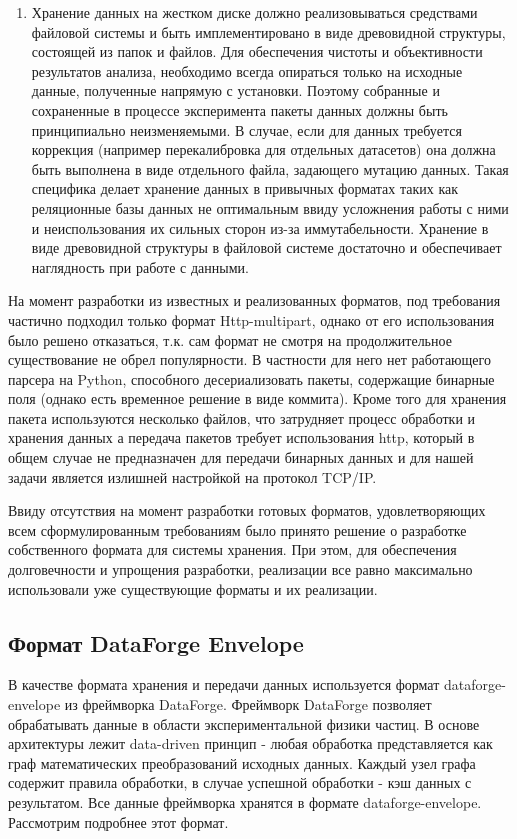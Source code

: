 \documentclass[a4paper,14pt]{extreport}
\begin{document}
\begin{enumerate}
    \item Хранение данных на жестком диске должно реализовываться средствами файловой системы и быть имплементировано в виде древовидной структуры, состоящей из папок и файлов. Для обеспечения чистоты и объективности результатов анализа, необходимо всегда опираться только на исходные данные, полученные напрямую с установки. Поэтому собранные и сохраненные в процессе эксперимента пакеты данных должны быть принципиально неизменяемыми. В случае, если для данных требуется коррекция (например перекалибровка для отдельных датасетов) она должна быть выполнена в виде отдельного файла, задающего мутацию данных. Такая специфика делает хранение данных в привычных форматах таких как реляционные базы данных не оптимальным ввиду усложнения работы с ними и неиспользования их сильных сторон из-за иммутабельности. Хранение в виде древовидной структуры в файловой системе достаточно и обеспечивает наглядность при работе с данными.
\end{enumerate}

На момент разработки из известных и реализованных форматов, под требования частично подходил только формат Http-multipart, однако от его использования было решено отказаться, т.к. сам формат не смотря на продолжительное существование не обрел популярности. В частности для него нет работающего парсера на Python, способного десериализовать пакеты, содержащие бинарные поля (однако есть временное решение в виде коммита\cite{multipart-fix}). Кроме того для хранения пакета используются несколько файлов, что затрудняет процесс обработки и хранения данных а передача пакетов требует использования http, который в общем случае не предназначен для передачи бинарных данных и для нашей задачи является излишней настройкой на протокол TCP/IP.

Ввиду отсутствия на момент разработки готовых форматов, удовлетворяющих всем сформулированным требованиям было принято решение о разработке собственного формата для системы хранения. При этом, для обеспечения долговечности и упрощения разработки, реализации все равно максимально использовали уже существующие форматы и их реализации.

\subsection{Формат DataForge Envelope}
В качестве формата хранения и передачи данных используется формат dataforge-envelope из фреймворка DataForge\cite{dataforge}. Фреймворк DataForge позволяет обрабатывать данные в области экспериментальной физики частиц. В основе архитектуры лежит data-driven принцип - любая обработка представляется как граф математических преобразований исходных данных. Каждый узел графа содержит правила обработки, в случае успешной обработки - кэш данных с результатом. Все данные фреймворка хранятся в формате dataforge-envelope. Рассмотрим подробнее этот формат.
\end{document}

